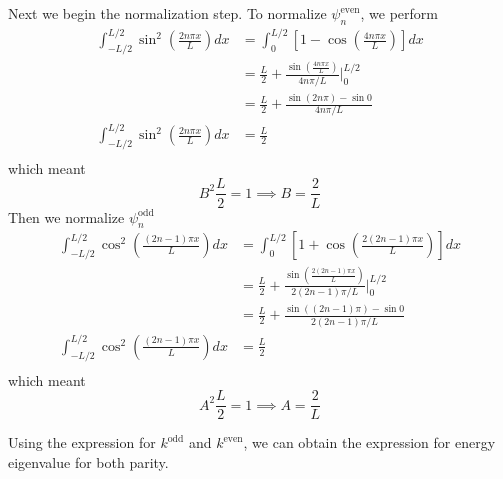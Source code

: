 \documentclass[../../../main.tex]{subfiles}
\begin{document}
Next we begin the normalization step.
To normalize $\psi_n^{\text{even}}$, we perform
\begin{align*}
    \int_{-L/2}^{L/2} \sin^2\left(\frac{2 n \pi x}{L}\right) dx & =  \int_0^{L/2} \left[1 - \cos\left(\frac{4 n \pi x}{L}\right)\right] dx                 \\
                                                                & = \frac{L }{2 }+ \frac{\sin\left(\frac{4 n \pi x}{L}\right)}{4 n \pi / L} \Bigg|_0^{L/2} \\
                                                                & = \frac{L }{2 }+\frac{\sin(2 n \pi) - \sin 0}{4 n \pi / L}                               \\
    \int_{-L/2}^{L/2} \sin^2\left(\frac{2 n \pi x}{L}\right) dx & =\frac{L }{2}                                                                            \\
\end{align*}
which meant
\begin{equation*}
    B^2 \frac{L }{2 }=1\implies B=\frac{2 }{L}
\end{equation*}
Then we normalize $\psi_n^{\text{odd}}$
\begin{align*}
    \int_{-L/2}^{L/2} \cos^2\left(\frac{(2n-1) \pi x}{L}\right) dx & =  \int_0^{L/2} \left[1 + \cos\left(\frac{2 (2n-1) \pi x}{L}\right)\right] dx                   \\
                                                                   & = \frac{L }{2 }+\frac{\sin\left(\frac{2 (2n-1) \pi x}{L}\right)}{2(2n-1)\pi / L} \Bigg|_0^{L/2} \\
                                                                   & = \frac{L }{2 }+ \frac{\sin((2n-1)\pi)-\sin0}{2(2n-1)\pi / L}                                   \\
    \int_{-L/2}^{L/2} \cos^2\left(\frac{(2n-1) \pi x}{L}\right) dx & = \frac{L }{2 }                                                                                 \\
\end{align*}
which meant
\begin{equation*}
    A^2 \frac{L }{2 }=1\implies A=\frac{2 }{L}
\end{equation*}

Using the expression for $k^{\text{odd}}$ and $k^{\text{even}}$, we can obtain the expression for energy eigenvalue for both parity.
\end{document}
